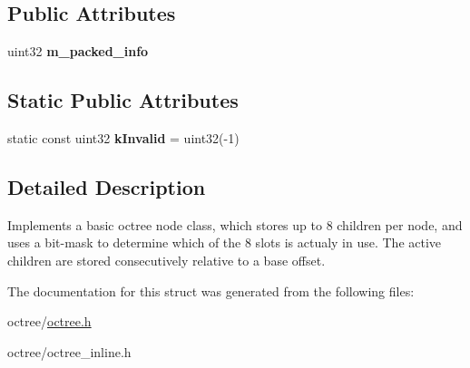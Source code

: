 \subsection*{\-Public \-Attributes}
\begin{DoxyCompactItemize}
\item 
\hypertarget{structnih_1_1_octree__node_adb5dd3768d479000e839e9848c66ad61}{
uint32 {\bfseries m\-\_\-packed\-\_\-info}}
\label{structnih_1_1_octree__node_adb5dd3768d479000e839e9848c66ad61}

\end{DoxyCompactItemize}
\subsection*{\-Static \-Public \-Attributes}
\begin{DoxyCompactItemize}
\item 
\hypertarget{structnih_1_1_octree__node_a494589b13a167062892181937e2203c4}{
static const uint32 {\bfseries k\-Invalid} = uint32(-\/1)}
\label{structnih_1_1_octree__node_a494589b13a167062892181937e2203c4}

\end{DoxyCompactItemize}


\subsection{\-Detailed \-Description}
\-Implements a basic octree node class, which stores up to 8 children per node, and uses a bit-\/mask to determine which of the 8 slots is actualy in use. \-The active children are stored consecutively relative to a base offset. 

\-The documentation for this struct was generated from the following files\-:\begin{DoxyCompactItemize}
\item 
octree/\hyperlink{octree_8h}{octree.\-h}\item 
octree/octree\-\_\-inline.\-h\end{DoxyCompactItemize}
